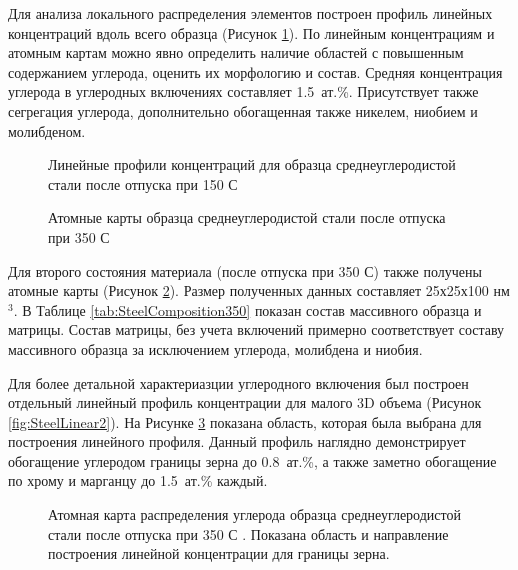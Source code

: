 Для анализа локального распределения элементов построен профиль линейных концентраций вдоль всего образца (Рисунок \cref{fig:SteelLinear1}). По линейным концентрациям и атомным картам можно явно определить наличие областей с повышенным содержанием углерода, оценить их морфологию и состав. Средняя концентрация углерода в углеродных включениях составляет 1.5~ат.\%. Присутствует также сегрегация углерода, дополнительно обогащенная также никелем, ниобием и молибденом.

\begin{figure}[ht]
	\caption{Линейные профили концентраций для образца среднеуглеродистой стали после отпуска при 150 \textdegree С \cite{scbibRyabov}}
	\label{fig:SteelLinear1}
\end{figure}

\begin{figure}[htb]
	\caption{Атомные карты образца среднеуглеродистой стали после отпуска при 350 \textdegree С \cite{scbibRyabov}}
	\label{fig:SteelAtomMaps2}
\end{figure}

Для второго состояния материала (после отпуска при 350 \textdegree С) также получены атомные карты (Рисунок \cref{fig:SteelAtomMaps2}). Размер полученных данных составляет 25х25х100 нм$^{3}$. В Таблице \cref{tab:SteelComposition350} показан состав массивного образца и матрицы. Состав матрицы, без учета включений примерно соответствует составу массивного образца за исключением углерода, молибдена и ниобия. 

Для более детальной характериазции углеродного включения был построен отдельный линейный профиль концентрации для малого 3D объема (Рисунок \cref{fig:SteelLinear2}). На Рисунке \cref{fig:SteelAtomMapsLin} показана область, которая была выбрана для построения линейного профиля. Данный профиль наглядно демонстрирует обогащение углеродом границы зерна до 0.8~ат.\%, а также заметно обогащение по хрому и марганцу до 1.5~ат.\% каждый.

\begin{figure}[htb]
	\caption{Атомная карта распределения углерода образца среднеуглеродистой стали после отпуска при 350 \textdegree С \cite{scbibRyabov}. Показана область и направление построения линейной концентрации для границы зерна.}
	\label{fig:SteelAtomMapsLin}
\end{figure}

